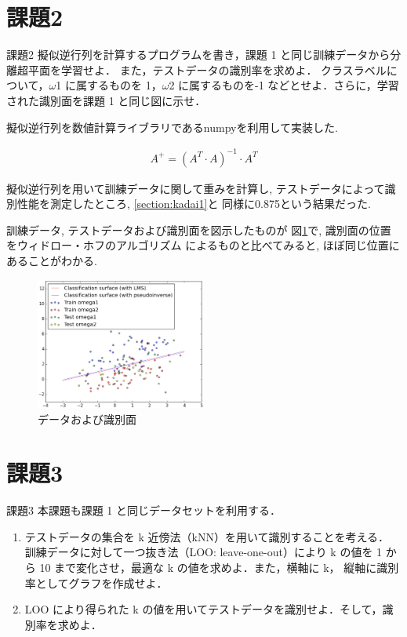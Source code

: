\documentclass[10pt,a4paper,twocolumn]{jarticle}
\begin{document}
\section{課題2}\label{section:kadai2}
\begin{itembox}{課題2}
  擬似逆行列を計算するプログラムを書き，課題 1 と同じ訓練データから分離超平面を学習せよ．
  また，テストデータの識別率を求めよ．
  クラスラベルについて，$\omega$1 に属するものを 1，$\omega$2 に属するものを-1 などとせよ．さらに，学習された識別面を課題 1 と同じ図に示せ．
\end{itembox}

擬似逆行列を数値計算ライブラリであるnumpyを利用して実装した. 

\begin{eqnarray*}
  A^{+} = (A^{T} \cdot A)^{-1} \cdot A^{T}
\end{eqnarray*}

擬似逆行列を用いて訓練データに関して重みを計算し, 
テストデータによって識別性能を測定したところ, \ref{section:kadai1}と
同様に0.875という結果だった. 

訓練データ, テストデータおよび識別面を図示したものが
図\ref{fig:kadai2}で, 識別面の位置をウィドロー・ホフのアルゴリズム
によるものと比べてみると, ほぼ同じ位置にあることがわかる. 

\begin{figure}[htbp]
  \centering
  \includegraphics[width=0.5\textwidth]{./assets/kadai2_plot_20150122_031556.eps}
  \caption{データおよび識別面}
  \label{fig:kadai2}
\end{figure}

\section{課題3}
\begin{itembox}{課題3}
  本課題も課題 1 と同じデータセットを利用する．
  \begin{enumerate}
    \item テストデータの集合を k 近傍法（kNN）を用いて識別することを考える． 訓練データに対して一つ抜き法（LOO: leave-one-out）により k の値を 1 から 10 まで変化させ，最適な k の値を求めよ．また，横軸に k， 縦軸に識別率としてグラフを作成せよ．
    \item LOO により得られた k の値を用いてテストデータを識別せよ．そして，識別率を求めよ．
  \end{enumerate}
\end{itembox}
\end{document}
